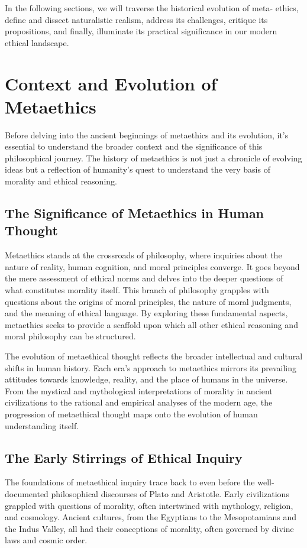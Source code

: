 \documentclass[12pt,a4paper]{article}
\begin{document}
In the following sections, we will traverse the historical evolution of meta- ethics, define and dissect naturalistic realism, address its challenges, critique its propositions, and finally, illuminate its practical significance in our modern ethical landscape.

\section{Context and Evolution of Metaethics}

Before delving into the ancient beginnings of metaethics and its evolution, it's essential to understand the broader context and the significance of this philosophical journey. The history of metaethics is not just a chronicle of evolving ideas but a reflection of humanity's quest to understand the very basis of morality and ethical reasoning.

\subsection{The Significance of Metaethics in Human Thought}
Metaethics stands at the crossroads of philosophy, where inquiries about the nature of reality, human cognition, and moral principles converge. It goes beyond the mere assessment of ethical norms and delves into the deeper questions of what constitutes morality itself. This branch of philosophy grapples with questions about the origins of moral principles, the nature of moral judgments, and the meaning of ethical language. By exploring these fundamental aspects, metaethics seeks to provide a scaffold upon which all other ethical reasoning and moral philosophy can be structured.

The evolution of metaethical thought reflects the broader intellectual and cultural shifts in human history. Each era's approach to metaethics mirrors its prevailing attitudes towards knowledge, reality, and the place of humans in the universe. From the mystical and mythological interpretations of morality in ancient civilizations to the rational and empirical analyses of the modern age, the progression of metaethical thought maps onto the evolution of human understanding itself.

\subsection{The Early Stirrings of Ethical Inquiry}
The foundations of metaethical inquiry trace back to even before the well-documented philosophical discourses of Plato and Aristotle. Early civilizations grappled with questions of morality, often intertwined with mythology, religion, and cosmology. Ancient cultures, from the Egyptians to the Mesopotamians and the Indus Valley, all had their conceptions of morality, often governed by divine laws and cosmic order.
\end{document}
